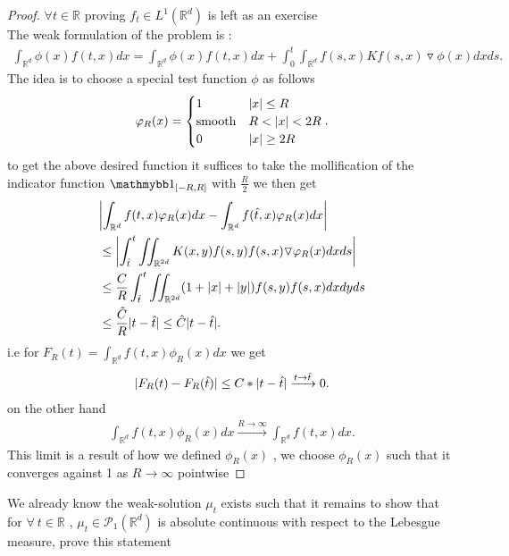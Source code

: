 \begin{proof}
  $\forall  t \in  \mathbb{R}$ proving $f_t \in  L^{1}(\mathbb{R}^{d} ) $ is left as an   exercise \\[1ex]
  The weak formulation of the problem is : 
  \begin{align*}
    \int_{\mathbb{R}^{d} }\phi(x) f(t,x) dx = \int_{\mathbb{R}^{d} }\phi(x) f(t,x) dx + \int_0^{t} \int_{\mathbb{R}^{d} } f(s,x)Kf(s,x) \triangledown \phi(x) dx ds
  .\end{align*}
  The idea is to choose a special test function $\phi $ as follows 
  \begin{align*}
    \varphi_R(x) = \begin{cases}
      1 &\lvert x\rvert \le R  \\
      \text{smooth} &R < \lvert x\rvert < 2R \\
      0 &\lvert x\rvert \ge  2R 
    \end{cases}
  .\end{align*}
  to get the above desired function it suffices to take the mollification of the indicator function $\cha_{[-R,R]}$ with $\frac{R}{2}$ we then get 
  \begin{align*}
    &\abs*{\int_{\mathbb{R}^{d} } f(t,x) \phi_R(x) dx - \int_{\mathbb{R}^{d} } f(\hat{t},x )\phi_R(x) dx}\\
    &\le  \abs*{\int_{\hat{t} }^{t} \iint_{\mathbb{R}^{2d} } K(x,y)f(s,y)f(s,x)\triangledown \phi_R(x) dx ds }\\
    &\le  \frac{C}{R}\int_{\hat{t} }^{t} \iint_{\mathbb{R}^{2d} } (1+\abs{x}+\abs{y})f(s,y)f(s,x) dx dy ds \\ 
    &\le  \frac{\tilde{C}}{R} \abs{t-\hat{t} } \le \hat{C} \abs{t-\hat{t} }
  .\end{align*}
  i.e for $F_R(t) = \int_{\mathbb{R}^{d} }f(t,x)\phi_R(x) dx$ we get 
  \begin{align*}
    \lvert F_R(t)-F_R(\hat{t} )\rvert \le  C* \lvert t-\hat{t} \rvert \xrightarrow{t \to  \hat{t} } 0
  .\end{align*}
  on the other hand 
  \begin{align*}
    \int_{\mathbb{R}^{d} } f(t,x) \phi_{R}(x) dx \xrightarrow{R \to \infty} \int_{\mathbb{R}^{d} }f(t,x) dx
  .\end{align*}
  This limit is a result of how we defined $\phi_R(x)$ , we choose $\phi_R(x)$ such that it converges against 1 as $R\to \infty$ pointwise
\end{proof}
\begin{exercise}
We already know the weak-solution $\mu_t$  exists such that it remains to show that for $\forall \ t \in  \mathbb{R}$ , $\mu_t \in  \mathcal{P}_1(\mathbb{R}^{d} )$ is absolute continuous 
with respect to the Lebesgue measure, prove this statement
\end{exercise}
